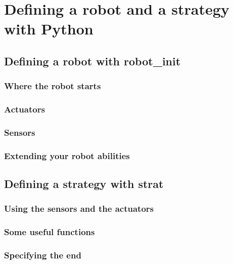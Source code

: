 \documentclass[a4paper,11pt]{article}
\begin{document}
\section{Defining a robot and a strategy with Python}

\subsection{Defining a robot with robot_init}

\subsubsection{Where the robot starts}

\subsubsection{Actuators}

\subsubsection{Sensors}

\subsubsection{Extending your robot abilities}


\subsection{Defining a strategy with strat}

\subsubsection{Using the sensors and the actuators}

\subsubsection{Some useful functions}

\subsubsection{Specifying the end}
\end{document}
